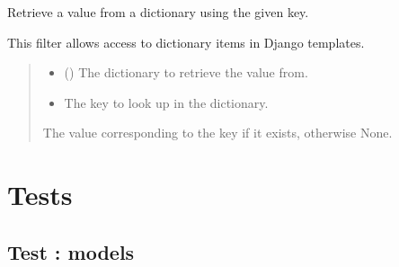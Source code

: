 \documentclass[letterpaper,10pt,english]{sphinxmanual}
\begin{document}
\begin{fulllineitems}
\label{\detokenize{courses.templatetags:courses.templatetags.custom_tags.get_item}}
\pysigstartsignatures
\pysiglinewithargsret
{}
{\sphinxparamcomma {}}
{}
\pysigstopsignatures
\sphinxAtStartPar
Retrieve a value from a dictionary using the given key.

\sphinxAtStartPar
This filter allows access to dictionary items in Django templates.
\begin{quote}\begin{description}
\begin{itemize}
\item {} 
\sphinxAtStartPar
{} () \textendash{} The dictionary to retrieve the value from.

\item {} 
\sphinxAtStartPar
{} \textendash{} The key to look up in the dictionary.

\end{itemize}

\sphinxAtStartPar
The value corresponding to the key if it exists, otherwise None.

\end{description}\end{quote}

\end{fulllineitems}



\section{Tests}
\label{\detokenize{courses:tests}}
\sphinxstepscope


\subsection{Test : models}
\label{\detokenize{courses.tests:module-courses.tests.test_models}}\label{\detokenize{courses.tests:test-models}}\label{\detokenize{courses.tests::doc}}
\end{document}
